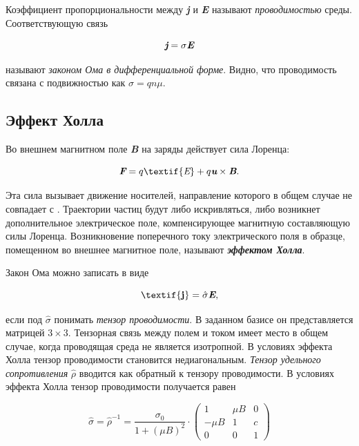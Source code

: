 \documentclass[a4paper,12pt]{article} %
\begin{document}
\hfill \break Коэффициент пропорциональности между \textit{\textbf{j}} и \textit{\textbf{E}} называют \textit{проводимостью} среды. Соответствующую связь

\begin{equation}\label{ linkname }
\textit{\textbf{j}} = \sigma\textit{\textbf{E}}
\end{equation}

\hfill \break называют \textit{законом Ома в дифференциальной форме}. Видно, что проводимость связана с подвижностью как $\sigma = qn\mu$.

\subsection{Эффект Холла}
\hfill \break Во внешнем магнитном поле \textit{\textbf{B}} на заряды действует сила Лоренца:

\begin{equation}\label{ linkname }
\textit{\textbf{F}} = q\textif{\textit{E}} + q\textit{\textbf{u}} \times \textit{\textbf{B}}.
\end{equation}

\hfill \break Эта сила вызывает движение носителей, направление которого в общем случае не совпадает с . Траектории частиц будут либо искривляться, либо возникнет дополнительное электрическое поле, компенсирующее магнитную составляющую силы Лоренца. Возникновение поперечного току электрического поля в образце, помещенном во внешнее магнитное поле, называют \textit{\textbf{эффектом Холла}}. 

\hfill \break Закон Ома можно записать в виде

\begin{equation}\label{ linkname }
\textif{\textbf{j}} = \hat{\sigma}\textit{\textbf{E}},
\end{equation}

\hfill \break если под $\hat{\sigma}$ понимать \textit{тензор проводимости}. В заданном базисе он представляется матрицей $3 \times 3$. Тензорная связь между полем и током имеет место в общем случае, когда проводящая среда не является изотропной. В условиях эффекта Холла тензор проводимости становится недиагональным. \textit{Тензор удельного сопротивления} $\hat{\rho}$ вводится как обратный к тензору проводимости. В условиях эффекта Холла тензор проводимости получается равен

\begin{equation}\label{ linkname }
\hat{\sigma} = \hat{\rho}^{-1} = \frac{\sigma_{0}}{1 + (\mu B)^2} \cdot \begin{pmatrix}
1 & \mu B & 0\\
-\mu B & 1 & c\\
0 & 0 & 1
\end{pmatrix}
\end{equation}
\end{document}
